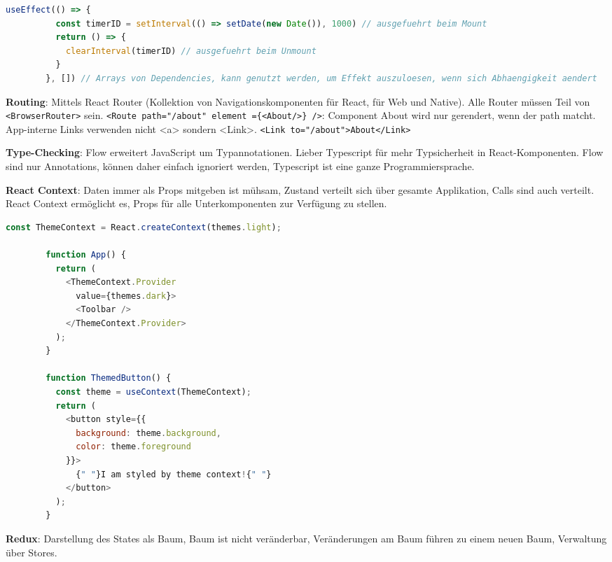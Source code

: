 \documentclass[10pt,landscape]{article}
\begin{document}
\begin{multicols}{2}
        \begin{lstlisting}[language=JavaScript]
        useEffect(() => {
          const timerID = setInterval(() => setDate(new Date()), 1000) // ausgefuehrt beim Mount
          return () => {
            clearInterval(timerID) // ausgefuehrt beim Unmount
          }
        }, []) // Arrays von Dependencies, kann genutzt werden, um Effekt auszuloesen, wenn sich Abhaengigkeit aendert
        \end{lstlisting}

        \textbf{Routing}: Mittels React Router (Kollektion von Navigationskomponenten für React, für Web und Native).
        Alle Router müssen Teil von \lstinline{<BrowserRouter>} sein.
        \lstinline[mathescape]!<Route path="/about" element ={<About/>} />!: Component About wird nur gerendert, wenn der path matcht.
        App-interne Links verwenden nicht <a> sondern <Link>. \lstinline[mathescape]!<Link to="/about">About</Link>!

        \textbf{Type-Checking}: Flow erweitert JavaScript um Typannotationen.
        Lieber Typescript für mehr Typsicherheit in React-Komponenten.
        Flow sind nur Annotations, können daher einfach ignoriert werden, Typescript ist eine ganze Programmiersprache.

        \textbf{React Context}: Daten immer als Props mitgeben ist mühsam, Zustand verteilt sich über gesamte Applikation, Calls sind auch verteilt.
        React Context ermöglicht es, Props für alle Unterkomponenten zur Verfügung zu stellen.

        \begin{lstlisting}[language=JavaScript]
        const ThemeContext = React.createContext(themes.light);

        function App() {
          return (
            <ThemeContext.Provider
              value={themes.dark}>
              <Toolbar />
            </ThemeContext.Provider>
          );
        }

        function ThemedButton() {
          const theme = useContext(ThemeContext);
          return (
            <button style={{
              background: theme.background,
              color: theme.foreground
            }}>
              {" "}I am styled by theme context!{" "}
            </button>
          );
        }
        \end{lstlisting}

        \textbf{Redux}: Darstellung des States als Baum, Baum ist nicht veränderbar, Veränderungen am Baum führen zu einem neuen Baum, Verwaltung über Stores.


\end{multicols}
\end{document}
